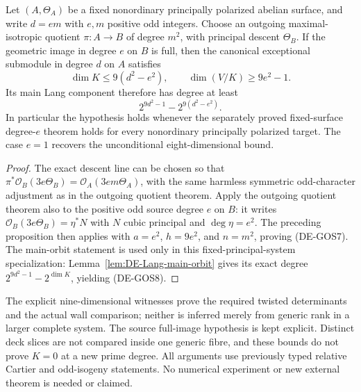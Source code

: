 \begin{corollary}
\label{cor:DE-general-source-principal-divisor-bound}
Let \((A,\Theta_A)\) be a fixed nonordinary principally polarized
abelian surface, and write \(d=em\) with \(e,m\) positive odd integers. Choose an
outgoing maximal-isotropic quotient \(\pi:A\to B\) of degree
\(m^2\), with principal descent \(\Theta_B\).
If the geometric image in degree \(e\) on \(B\) is full, then the
canonical exceptional submodule in degree \(d\) on \(A\) satisfies
\[
 \dim K\leq 9(d^2-e^2),\qquad
 \dim(V/K)\geq9e^2-1.
 \tag{DE-GOS7}
\]
Its main Lang component therefore has degree at least
\[
                   2^{9d^2-1}-2^{9(d^2-e^2)}.
 \tag{DE-GOS8}
\]
In particular the hypothesis holds whenever the separately proved
fixed-surface degree-\(e\) theorem holds for every nonordinary
principally polarized target. The case \(e=1\) recovers the
unconditional eight-dimensional bound.
\end{corollary}
\begin{proof}
The exact descent line can be chosen so that
\(\pi^*\mathcal O_B(3e\Theta_B)
  =\mathcal O_A(3em\Theta_A)\), with the same harmless symmetric
odd-character adjustment as in the outgoing quotient theorem.
Apply the outgoing quotient theorem also to the positive odd
source degree \(e\) on \(B\): it writes
\(\mathcal O_B(3e\Theta_B)=\eta^*N\) with \(N\) cubic principal
and \(\deg\eta=e^2\). The preceding proposition then applies
with \(a=e^2\), \(h=9e^2\), and \(n=m^2\), proving (DE-GOS7). The main-orbit statement is used only in this
fixed-principal-system specialization: Lemma~\ref{lem:DE-Lang-main-orbit}
gives its exact degree \(2^{9d^2-1}-2^{\dim K}\), yielding (DE-GOS8).
\end{proof}

\begin{remark}
\label{rem:DE-general-odd-source-scope}
The explicit nine-dimensional witnesses prove the required twisted
determinants and the actual wall comparison; neither is inferred
merely from generic rank in a larger complete system. The source
full-image hypothesis is kept explicit. Distinct deck slices are not
compared inside one generic fibre, and these bounds do not prove
\(K=0\) at a new prime degree. All arguments use previously typed
relative Cartier and odd-isogeny statements. No numerical experiment
or new external theorem is needed or claimed.
\end{remark}
